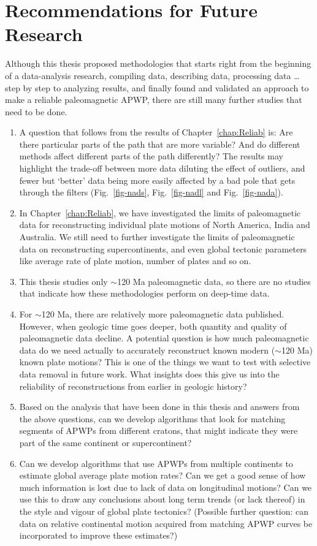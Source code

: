 \section{Recommendations for Future Research}

Although this thesis proposed methodologies that starts right from the
beginning of a data-analysis research, compiling data, describing data,
processing data \ldots step by step to analyzing results, and finally found and
validated an approach to make a reliable paleomagnetic APWP, there are still
many further studies that need to be done.
%
\begin{enumerate}
  \item A question that follows from the results of Chapter~\ref{chap:Reliab}
    is: Are there particular parts of the path that are more variable? And do
    different methods affect different parts of the path differently? The
    results may highlight the trade-off between more data diluting the effect of
    outliers, and fewer but `better' data being more easily affected by a bad
    pole that gets through the filters (Fig.~\ref{fig-nads}, Fig.~\ref{fig-nadl}
    and Fig.~\ref{fig-nada}).
  \item In Chapter~\ref{chap:Reliab}, we have investigated the limits of
    paleomagnetic data for reconstructing individual plate motions of North
    America, India and Australia. We still need to further investigate the
    limits of paleomagnetic data on reconstructing supercontinents, and even
    global tectonic parameters like average rate of plate motion, number of
    plates and so on.
  \item This thesis studies only $\sim$120 Ma paleomagnetic data, so
    there are no studies that indicate how these methodologies perform on
    deep-time data.
  \item For $\sim$120 Ma, there are relatively more paleomagnetic
    data published. However, when geologic time goes deeper, both quantity and
    quality of paleomagnetic data decline. A potential question is how much
    paleomagnetic data do we need actually to accurately reconstruct known
    modern ($\sim$120 Ma) known plate motions? This is one of the
    things we want to test with selective data removal in future work. What
    insights does this give us into the reliability of reconstructions from
    earlier in geologic history?
  \item Based on the analysis that have been done in this thesis and answers
    from the above questions, can we develop algorithms that look for matching
    segments of APWPs from different cratons, that might indicate they were part
    of the same continent or supercontinent?
  \item Can we develop algorithms that use APWPs from multiple continents to
    estimate global average plate motion rates? Can we get a good sense of how
    much information is lost due to lack of data on longitudinal motions? Can we
    use this to draw any conclusions about long term trends (or lack thereof) in
    the style and vigour of global plate tectonics? (Possible further question:
    can data on relative continental motion acquired from matching APWP curves
    be incorporated to improve these estimates?)
\end{enumerate}
